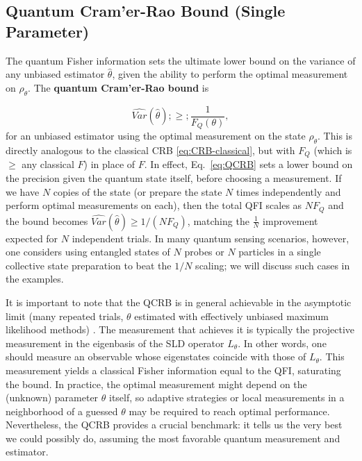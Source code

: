 \subsection{Quantum Cram'er-Rao Bound (Single Parameter)}



The quantum Fisher information sets the ultimate lower bound on the
variance of any unbiased estimator $\hat{\theta}$, given the ability
to perform the optimal measurement on $\rho_\theta$. The
\textbf{quantum Cram'er-Rao bound} is

\begin{equation}
\widehat{Var}(\hat{\theta}) ;\ge; \frac{1}{F_Q(\theta)},
\label{eq:QCRB}
\end{equation}
for an unbiased estimator using the optimal measurement on the state
$\rho_\theta$. This is directly analogous to the classical CRB
\eqref{eq:CRB-classical}, but with $F_Q$ (which is $\ge$ any classical
$F$) in place of $F$. In effect, Eq.~\eqref{eq:QCRB} sets a lower
bound on the precision given the quantum state itself, before choosing
a measurement. If we have $N$ copies of the state (or prepare the
state $N$ times independently and perform optimal measurements on
each), then the total QFI scales as $N F_Q$ and the bound becomes
$\widehat{Var}(\hat{\theta}) \ge 1/(N F_Q)$, matching the $\frac{1}{N}$
improvement expected for $N$ independent trials. In many quantum
sensing scenarios, however, one considers using entangled states of
$N$ probes or $N$ particles in a single collective state preparation
to beat the $1/N$ scaling; we will discuss such cases in the examples.



It is important to note that the QCRB is in general achievable in the
asymptotic limit (many repeated trials, $\theta$ estimated with
effectively unbiased maximum likelihood methods)
\cite{BraunsteinCaves1994, Helstrom1976}. The measurement that
achieves it is typically the projective measurement in the eigenbasis
of the SLD operator $L_\theta$. In other words, one should measure an
observable whose eigenstates coincide with those of $L_\theta$. This
measurement yields a classical Fisher information equal to the QFI,
saturating the bound. In practice, the optimal measurement might
depend on the (unknown) parameter $\theta$ itself, so adaptive
strategies or local measurements in a neighborhood of a guessed
$\theta$ may be required to reach optimal performance. Nevertheless,
the QCRB provides a crucial benchmark: it tells us the very best we
could possibly do, assuming the most favorable quantum measurement and
estimator.



